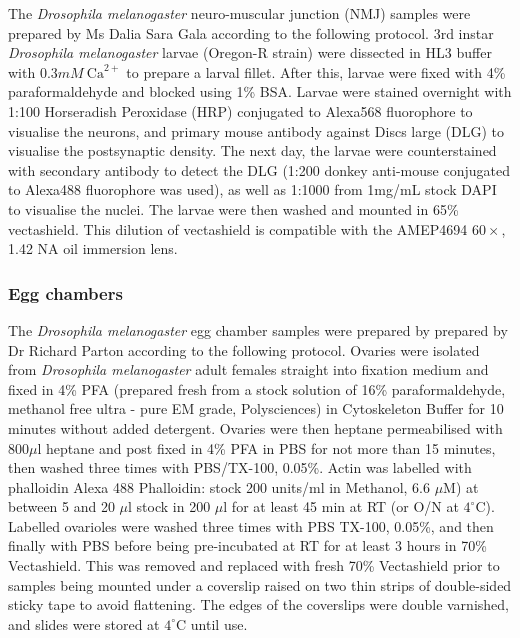 The \textit{Drosophila melanogaster} neuro-muscular junction (NMJ) 
samples were prepared by Ms Dalia Sara Gala according to the following protocol. 3rd instar \textit{Drosophila melanogaster} larvae (Oregon-R 
strain) were dissected in HL3 buffer with $0.3mM~\text{Ca}^{2+}$ to 
prepare a larval fillet. After this, larvae were fixed with 
4\% paraformaldehyde and blocked using 1\% BSA.\cite{brent2009drosophila} Larvae were stained overnight with 1:100 Horseradish Peroxidase (HRP) 
conjugated to Alexa568 fluorophore to visualise the neurons, and 
primary mouse antibody against Discs large (DLG) to visualise the 
postsynaptic density. The next day, the larvae were counterstained 
with secondary antibody to detect the DLG (1:200 donkey anti-mouse 
conjugated to Alexa488 fluorophore was used), as well as 1:1000 from 1mg/mL 
stock DAPI to visualise the nuclei. The larvae were then washed and mounted 
in 65\% vectashield\cite{brent2009drosophila}. This dilution of 
vectashield is compatible with the AMEP4694 $60\times$, 1.42 NA oil 
immersion lens.

\subsubsection{Egg chambers}
\label{subsubsec:Aurox_Egg_chambers_prep}


The \textit{Drosophila melanogaster} egg chamber samples were prepared by prepared by Dr Richard Parton according to the following protocol. Ovaries were isolated from \textit{Drosophila 
melanogaster} adult females straight into fixation medium and fixed in 4\% PFA 
(prepared fresh from a stock solution of 16\% paraformaldehyde, methanol free 
ultra - pure EM grade, Polysciences) in Cytoskeleton Buffer for 10 minutes 
without added 
detergent\cite{jia2016automatic,zhang2020nanoscale,leyton2016pfa}.  Ovaries 
were then heptane permeabilised with 800$\mu$l heptane and post fixed in 4\% 
PFA in PBS for not more than 15 minutes, then washed three times with 
PBS/TX-100, 0.05\%. Actin was labelled with phalloidin Alexa 488 Phalloidin: 
stock 200 units/ml in Methanol, 6.6 $\mu$M) at between 5 and 20 $\mu$l stock 
in 200 $\mu$l for at least 45 min at RT (or O/N at $4^{\circ}$C). Labelled 
ovarioles were washed three times with PBS TX-100, 0.05\%, and then finally 
with PBS before being pre-incubated at RT for at least 3 hours in 70\% 
Vectashield. This was removed and replaced with fresh 70\% Vectashield prior 
to samples being mounted under a coverslip raised on two thin strips of 
double-sided sticky tape to avoid flattening\cite{davidson2016localized}. The 
edges of the coverslips were double varnished, and slides were stored at 
$4^{\circ}$C until use.

